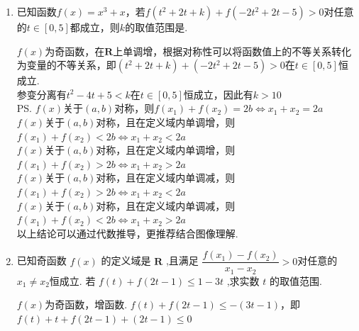 \begin{enumerate}
\begin{enumerate}
\begin{jieda}
        又因为 $f\left( x\right)$ 在 $\mathbf{R}$ 上单调递增,所以 $3 + m > 7 - {3m}$ ,解得 $m > 1$ .
    \end{jieda}
    \item 已知函数$f(x) = x^3+x$，若$f(t^2+2t+k)+f(-2t^2+2t-5)>0$对任意的$t \in [0, 5]$都成立，则$k$的取值范围是.
    \begin{jieda}
        $f(x)$为奇函数，在$\mathbf{R}$上单调增，根据对称性可以将函数值上的不等关系转化为变量的不等关系，即$(t^2+2t+k)+(-2t^2+2t-5)>0$在$t \in [0, 5]$恒成立.\\
        参变分离有$t^2-4t+5 < k$在$t \in [0, 5]$恒成立，因此有$k > 10$ \\
        \ps $f(x)$关于$(a, b)$对称，则$f(x_1) + f(x_2) = 2b \Longleftrightarrow x_1 + x_2 = 2a$ \\
        $f(x)$关于$(a, b)$对称，且在定义域内单调增，则$f(x_1) + f(x_2) < 2b \Longleftrightarrow x_1 + x_2 < 2a$ \\
        $f(x)$关于$(a, b)$对称，且在定义域内单调增，则$f(x_1) + f(x_2) > 2b \Longleftrightarrow x_1 + x_2 > 2a$ \\
        $f(x)$关于$(a, b)$对称，且在定义域内单调减，则$f(x_1) + f(x_2) > 2b \Longleftrightarrow x_1 + x_2 < 2a$ \\
        $f(x)$关于$(a, b)$对称，且在定义域内单调减，则$f(x_1) + f(x_2) < 2b \Longleftrightarrow x_1 + x_2 > 2a$ \\
        以上结论可以通过代数推导，更推荐结合图像理解.
    \end{jieda}
    
    \item 已知奇函数 $f\left( x\right)$ 的定义域是 $\mathbf{R}$ ,且满足 $\dfrac{f(x_1)-f(x_2)}{x_1-x_2} > 0$对任意的$x_1 \neq x_2$恒成立. 若 $f\left( t\right)  + f\left( {2t - 1}\right)  \leq  1 - 3t$ ,求实数 $t$ 的取值范围.
    \begin{jieda}
        $f(x)$为奇函数，增函数. $f(t) + f(2t-1) \leq -(3t-1)$，即$f(t)+t + f(2t-1)+(2t-1) \leq 0$


\end{jieda}
\end{enumerate}
\end{enumerate}
